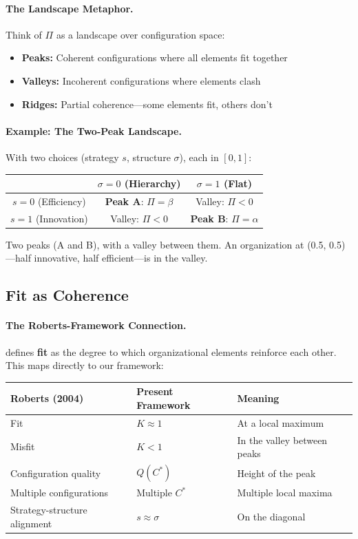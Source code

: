 \documentclass[12pt,a4paper]{article}
\begin{document}
\paragraph{The Landscape Metaphor.}
Think of $\Pi$ as a landscape over configuration space:
\begin{itemize}
  \item \textbf{Peaks:} Coherent configurations where all elements fit together
  \item \textbf{Valleys:} Incoherent configurations where elements clash
  \item \textbf{Ridges:} Partial coherence---some elements fit, others don't
\end{itemize}

\paragraph{Example: The Two-Peak Landscape.}
With two choices (strategy $s$, structure $\sigma$), each in $[0,1]$:

\begin{center}
\begin{tabular}{ccc}
& $\sigma = 0$ (Hierarchy) & $\sigma = 1$ (Flat) \\
\hline
$s = 0$ (Efficiency) & \textbf{Peak A}: $\Pi = \beta$ & Valley: $\Pi < 0$ \\
$s = 1$ (Innovation) & Valley: $\Pi < 0$ & \textbf{Peak B}: $\Pi = \alpha$ \\
\end{tabular}
\end{center}

Two peaks (A and B), with a valley between them.
An organization at (0.5, 0.5)---half innovative, half efficient---is in the valley.

\subsection{Fit as Coherence}

\paragraph{The Roberts-Framework Connection.}
\citet{roberts2004} defines \textbf{fit} as the degree to which
organizational elements reinforce each other.
This maps directly to our framework:

\begin{center}
\renewcommand{\arraystretch}{1.3}
\begin{tabular}{lll}
\hline
\textbf{Roberts (2004)} & \textbf{Present Framework} & \textbf{Meaning} \\
\hline
Fit & $K \approx 1$ & At a local maximum \\
Misfit & $K < 1$ & In the valley between peaks \\
Configuration quality & $Q(C^*)$ & Height of the peak \\
Multiple configurations & Multiple $C^*$ & Multiple local maxima \\
Strategy-structure alignment & $s \approx \sigma$ & On the diagonal \\
\hline
\end{tabular}
\end{center}
\end{document}
